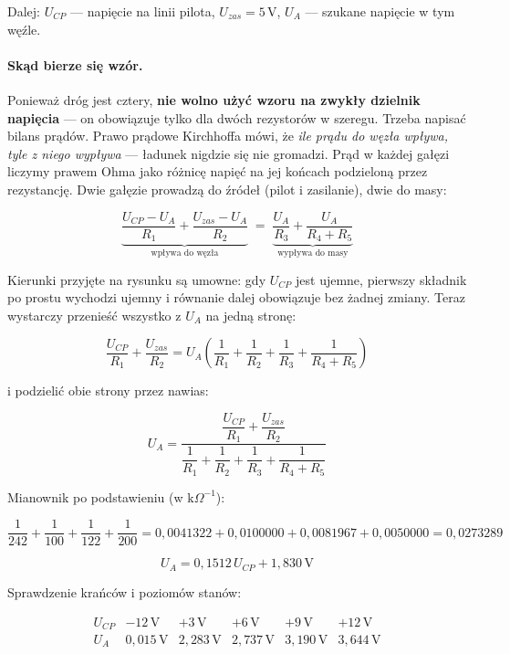 \documentclass[a4paper,11pt]{article}
\newcommand{\volt}{\,\mathrm{V}}
\begin{document}
Dalej: $U_{CP}$ --- napięcie na linii pilota, $U_{zas}=5\volt$, $U_A$ --- szukane
napięcie w tym węźle.

\paragraph{Skąd bierze się wzór.} Ponieważ dróg jest cztery, \textbf{nie wolno użyć
wzoru na zwykły dzielnik napięcia} --- on obowiązuje tylko dla dwóch rezystorów
w szeregu. Trzeba napisać bilans prądów. Prawo prądowe Kirchhoffa mówi, że
\emph{ile prądu do węzła wpływa, tyle z niego wypływa} --- ładunek nigdzie się nie
gromadzi. Prąd w każdej gałęzi liczymy prawem Ohma jako różnicę napięć na jej
końcach podzieloną przez rezystancję. Dwie gałęzie prowadzą do źródeł (pilot
i zasilanie), dwie do masy:

\begin{equation}
\underbrace{\frac{U_{CP}-U_A}{R_1}+\frac{U_{zas}-U_A}{R_2}}_{\text{wpływa do węzła}}
\;=\;
\underbrace{\frac{U_A}{R_3}+\frac{U_A}{R_4+R_5}}_{\text{wypływa do masy}}
\label{eq:bilans}
\end{equation}

Kierunki przyjęte na rysunku są umowne: gdy $U_{CP}$ jest ujemne, pierwszy
składnik po prostu wychodzi ujemny i równanie dalej obowiązuje bez żadnej zmiany.
Teraz wystarczy przenieść wszystko z $U_A$ na jedną stronę:

\[
\frac{U_{CP}}{R_1}+\frac{U_{zas}}{R_2}
= U_A\left(\frac{1}{R_1}+\frac{1}{R_2}+\frac{1}{R_3}+\frac{1}{R_4+R_5}\right)
\]

i podzielić obie strony przez nawias:

\begin{equation}
U_A=\frac{\dfrac{U_{CP}}{R_1}+\dfrac{U_{zas}}{R_2}}
         {\dfrac{1}{R_1}+\dfrac{1}{R_2}+\dfrac{1}{R_3}+\dfrac{1}{R_4+R_5}}
\label{eq:wezelA}
\end{equation}

Mianownik po podstawieniu (w $\mathrm{k}\Omega^{-1}$):

\[
\frac{1}{242}+\frac{1}{100}+\frac{1}{122}+\frac{1}{200}
=0{,}0041322+0{,}0100000+0{,}0081967+0{,}0050000=0{,}0273289
\]

\begin{equation}
\boxed{\;U_A=0{,}1512\,U_{CP}+1{,}830\volt\;}
\label{eq:przelicznik}
\end{equation}

Sprawdzenie krańców i poziomów stanów:

\[
\begin{array}{r|ccccc}
U_{CP} & -12\volt & +3\volt & +6\volt & +9\volt & +12\volt \\[0.5mm]
\hline
U_A & 0{,}015\volt & 2{,}283\volt & 2{,}737\volt & 3{,}190\volt & 3{,}644\volt
\end{array}
\]
\end{document}
